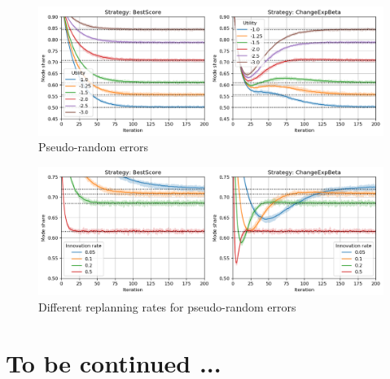 \documentclass[a4paper]{article}
\begin{document}
\begin{figure}[h!]
    \centering
    \includegraphics[width=\textwidth]{images/errors.png}
    \caption{Pseudo-random errors}
    \label{fig:errors}
\end{figure}

\begin{figure}[h!]
    \centering
    \includegraphics[width=\textwidth]{images/replanning_rates.png}
    \caption{Different replanning rates for pseudo-random errors}
    \label{fig:replanning_rates}
\end{figure}

\section{To be continued ...}
\end{document}

